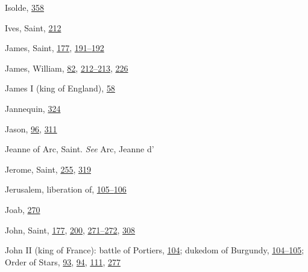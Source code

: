 Isolde,
\protect\hyperlink{21_Chapter_Thirteen__IMAGE_AND_WORD.xhtmlux5cux23page_358}{358}

Ives, Saint,
\protect\hyperlink{14_Chapter_Seven__THE_PIOUS_PERSONA.xhtmlux5cux23page_212}{212}

James, Saint,
\protect\hyperlink{13_Chapter_Six__THE_DEPICTION_OF_TH.xhtmlux5cux23page_177}{177},
\protect\hyperlink{13_Chapter_Six__THE_DEPICTION_OF_TH.xhtmlux5cux23page_191}{191--}\protect\hyperlink{13_Chapter_Six__THE_DEPICTION_OF_TH.xhtmlux5cux23page_192}{192}

James, William,
\protect\hyperlink{10_Chapter_Three__THE_HEROIC_DREAM.xhtmlux5cux23page_82}{82},
\protect\hyperlink{14_Chapter_Seven__THE_PIOUS_PERSONA.xhtmlux5cux23page_212}{212--}\protect\hyperlink{14_Chapter_Seven__THE_PIOUS_PERSONA.xhtmlux5cux23page_213}{213},
\protect\hyperlink{15_Chapter_Eight__RELIGIOUS_EXCITAT.xhtmlux5cux23page_226}{226}

James I (king of England),
\protect\hyperlink{09_Chapter_Two__THE_CRAVING_FOR_A_M.xhtmlux5cux23page_58}{58}

Jannequin,
\protect\hyperlink{20_ILLUSTRATIONS_FOLLOW_PAGE.xhtmlux5cux23page_324}{324}

Jason,
\protect\hyperlink{10_Chapter_Three__THE_HEROIC_DREAM.xhtmlux5cux23page_96}{96},
\protect\hyperlink{20_ILLUSTRATIONS_FOLLOW_PAGE.xhtmlux5cux23page_311}{311}

Jeanne of Arc, Saint. \emph{See} Arc, Jeanne d'

Jerome, Saint,
\protect\hyperlink{17_Chapter_Ten__THE_FAILURE_OF_IMAG.xhtmlux5cux23page_255}{255},
\protect\hyperlink{20_ILLUSTRATIONS_FOLLOW_PAGE.xhtmlux5cux23page_319}{319}

Jerusalem, liberation of,
\protect\hyperlink{10_Chapter_Three__THE_HEROIC_DREAM.xhtmlux5cux23page_105}{105--}\protect\hyperlink{10_Chapter_Three__THE_HEROIC_DREAM.xhtmlux5cux23page_106}{106}

Joab,
\protect\hyperlink{18_Chapter_Eleven__THE_FORMS_OF_THO.xhtmlux5cux23page_270}{270}

John, Saint,
\protect\hyperlink{13_Chapter_Six__THE_DEPICTION_OF_TH.xhtmlux5cux23page_177}{177},
\protect\hyperlink{13_Chapter_Six__THE_DEPICTION_OF_TH.xhtmlux5cux23page_200}{200},
\protect\hyperlink{18_Chapter_Eleven__THE_FORMS_OF_THO.xhtmlux5cux23page_271}{271--}\protect\hyperlink{18_Chapter_Eleven__THE_FORMS_OF_THO.xhtmlux5cux23page_272}{272},
\protect\hyperlink{20_ILLUSTRATIONS_FOLLOW_PAGE.xhtmlux5cux23page_308}{308}

John II (king of France): battle of Portiers,
\protect\hyperlink{10_Chapter_Three__THE_HEROIC_DREAM.xhtmlux5cux23page_104}{104};
dukedom of Burgundy,
\protect\hyperlink{10_Chapter_Three__THE_HEROIC_DREAM.xhtmlux5cux23page_104}{104--}\protect\hyperlink{10_Chapter_Three__THE_HEROIC_DREAM.xhtmlux5cux23page_105}{105};
Order of Stars,
\protect\hyperlink{10_Chapter_Three__THE_HEROIC_DREAM.xhtmlux5cux23page_93}{93},
\protect\hyperlink{10_Chapter_Three__THE_HEROIC_DREAM.xhtmlux5cux23page_94}{94},
\protect\hyperlink{10_Chapter_Three__THE_HEROIC_DREAM.xhtmlux5cux23page_111}{111},
\protect\hyperlink{18_Chapter_Eleven__THE_FORMS_OF_THO.xhtmlux5cux23page_277}{277}


